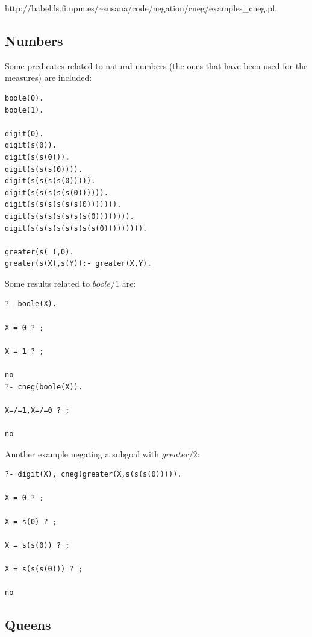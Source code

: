 \documentclass{tlp}
\begin{document}
http://babel.ls.fi.upm.es/\~{}susana/code/negation/cneg/examples\_cneg.pl.

\subsection*{Numbers}

Some predicates related to natural numbers (the ones that have been used for
the measures) are included:
\begin{small}
\begin{verbatim}
boole(0).
boole(1).

digit(0).
digit(s(0)).
digit(s(s(0))).
digit(s(s(s(0)))).
digit(s(s(s(s(0))))).
digit(s(s(s(s(s(0)))))).
digit(s(s(s(s(s(s(0))))))).
digit(s(s(s(s(s(s(s(0)))))))).
digit(s(s(s(s(s(s(s(s(0))))))))).

greater(s(_),0).
greater(s(X),s(Y)):- greater(X,Y).

\end{verbatim}
\end{small}

Some results related to $boole/1$ are:
\begin{small}
\begin{verbatim}
?- boole(X).

X = 0 ? ;

X = 1 ? ;

no
?- cneg(boole(X)).

X=/=1,X=/=0 ? ;

no
\end{verbatim}
\end{small}

Another example negating a subgoal with $greater/2$:
\begin{small}
\begin{verbatim}
?- digit(X), cneg(greater(X,s(s(s(0))))).

X = 0 ? ;

X = s(0) ? ;

X = s(s(0)) ? ;

X = s(s(s(0))) ? ;

no
\end{verbatim}
\end{small}

\subsection*{Queens}
\end{document}
